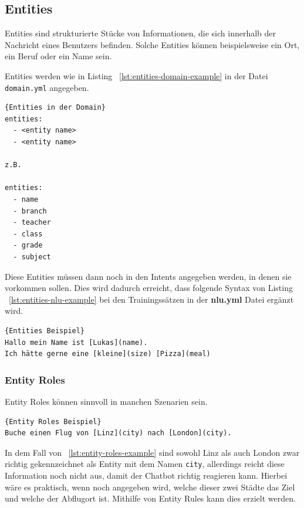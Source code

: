 \subsection{Entities}\label{subsection:entities}

Entities sind strukturierte Stücke von Informationen, die sich innerhalb der Nachricht eines Benutzers befinden.
Solche Entities können beispielsweise ein Ort, ein Beruf oder ein Name sein.\cite{entities}

Entities werden wie in Listing ~\ref{lst:entities-domain-example} in der Datei \texttt{domain.yml} angegeben.

\begin{lstlisting}[label={lst:entities-domain-example},caption={Entities in der Domain}]{Entities in der Domain}
entities:
  - <entity name>
  - <entity name>

z.B.

entities:
  - name
  - branch
  - teacher
  - class
  - grade
  - subject
\end{lstlisting}

Diese Entities müssen dann noch in den Intents angegeben werden, in denen sie vorkommen sollen.
Dies wird dadurch erreicht, dass folgende Syntax von Listing ~\ref{lst:entities-nlu-example} bei den Trainingssätzen in der \textbf{nlu.yml} Datei ergänzt wird.

\begin{lstlisting}[label={lst:entities-nlu-example},caption={Entities Beispiel}]{Entities Beispiel}
Hallo mein Name ist [Lukas](name).
Ich hätte gerne eine [kleine](size) [Pizza](meal)
\end{lstlisting}

\subsubsection{Entity Roles}\label{subsubsec:entity-roles}

Entity Roles können sinnvoll in manchen Szenarien sein.

\begin{lstlisting}[label={lst:entity-roles-example},caption={Entity Roles Beispiel}]{Entity Roles Beispiel}
Buche einen Flug von [Linz](city) nach [London](city).
\end{lstlisting}

In dem Fall von ~\ref{lst:entity-roles-example} sind sowohl Linz als auch London zwar richtig gekennzeichnet als Entity mit dem Namen \texttt{city}, allerdings reicht diese Information noch nicht aus, damit der Chatbot richtig reagieren kann.
Hierbei wäre es praktisch, wenn noch angegeben wird, welche dieser zwei Städte das Ziel und welche der Abflugort ist.
Mithilfe von Entity Rules kann dies erzielt werden.\cite{entityRolesGroups}

